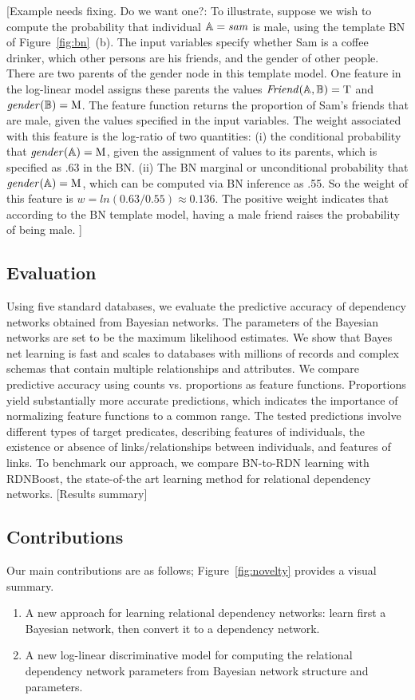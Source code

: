 \documentclass[runningheads,a4paper]{llncs}
\begin{document}
[Example needs fixing. Do we want one?: To illustrate, suppose we wish to compute the probability that individual $\mathbb{A} = \it{sam}$ is male, using the template BN of Figure~\ref{fig:bn}~(b).  The input variables specify whether Sam is a coffee drinker, which other persons are his friends, and the gender of other people. There are two parents of the gender node in this template model. One feature in the log-linear model assigns these parents the values $\it{Friend}(\mathbb{A},\mathbb{B}) = \mathrm{T}$ and $\it{gender}(\mathbb{B}) = \mathrm{M}$. The feature function returns the proportion of Sam's friends that are male, given the values specified in the input variables. The weight associated with this feature is the log-ratio of two quantities: (i) the conditional probability that $\it{gender}(\mathbb{A}) = \mathrm{M}$, given the assignment of values to its parents, which is specified as .63 in the BN. (ii) The BN marginal or unconditional probability that $\it{gender}(\mathbb{A}) = \mathrm{M}$, which can be computed via BN inference as .55. So the weight of this feature is $w = ln(0.63/0.55) \approx 0.136$. The positive weight indicates that according to the BN template model, having a male friend raises the probability of being male. ]

  
\subsection{Evaluation} Using five standard databases, we evaluate the predictive accuracy of dependency networks obtained from Bayesian networks. The parameters of the Bayesian networks are set to be the maximum likelihood estimates. We show that Bayes net learning is fast and scales to databases with millions of records and complex schemas that contain multiple relationships and attributes. We compare predictive accuracy using counts vs. proportions as feature functions.  Proportions yield substantially more accurate predictions, which indicates the importance of normalizing feature functions to a common range. The tested predictions involve different types of target predicates, describing features of individuals,  the existence or absence of links/relationships between individuals, and features of links. To benchmark our approach, we compare BN-to-RDN learning with RDNBoost, the state-of-the art learning method for relational dependency networks. [Results summary] 



\subsection{Contributions} 
Our main contributions are as follows; Figure~\ref{fig:novelty} provides a visual summary.  
\begin{enumerate}
\item A new approach for learning relational dependency networks: learn first a Bayesian network, then convert it to a dependency network.
\item A new log-linear discriminative model for computing the relational dependency network parameters from Bayesian network structure and parameters.
\end{enumerate}
\end{document}
